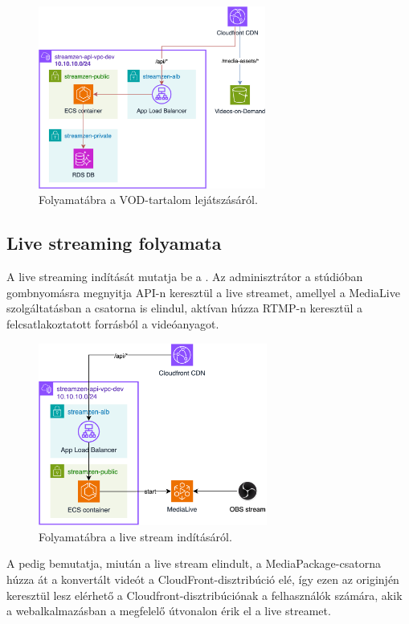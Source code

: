 \begin{figure}[]
	\centering
	\includegraphics[height=60mm, keepaspectratio]{figures/dipterv_vod3.png}
	\caption{Folyamatábra a VOD-tartalom lejátszásáról.}
	\label{fig:vod3}
\end{figure}

\subsection{Live streaming folyamata}

A live streaming indítását mutatja be a . Az adminisztrátor a stúdióban gombnyomásra megnyitja API-n keresztül a live streamet, amellyel a MediaLive szolgáltatásban a csatorna is elindul, aktívan húzza RTMP-n keresztül a felcsatlakoztatott forrásból a videóanyagot.

\begin{figure}[]
	\centering
	\includegraphics[height=60mm, keepaspectratio]{figures/dipterv_live1.png}
	\caption{Folyamatábra a live stream indításáról.}
	\label{fig:live1}
\end{figure}

A  pedig bemutatja, miután a live stream elindult, a MediaPackage-csatorna húzza át a konvertált videót a CloudFront-disztribúció elé, így ezen az originjén keresztül lesz elérhető a Cloudfront-disztribúciónak a felhasználók számára, akik a webalkalmazásban a megfelelő útvonalon érik el a live streamet.

